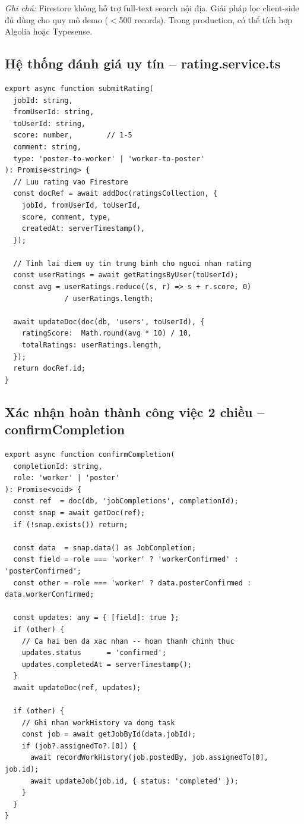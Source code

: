 \textit{Ghi chú:} Firestore không hỗ trợ full-text search nội địa. Giải pháp lọc
client-side đủ dùng cho quy mô demo ($<$500 records). Trong production, có thể tích hợp
Algolia hoặc Typesense.

\subsection{Hệ thống đánh giá uy tín -- rating.service.ts}

\begin{lstlisting}[caption={rating.service.ts -- submitRating và cập nhật điểm uy tín tự động}]
export async function submitRating(
  jobId: string,
  fromUserId: string,
  toUserId: string,
  score: number,        // 1-5
  comment: string,
  type: 'poster-to-worker' | 'worker-to-poster'
): Promise<string> {
  // Luu rating vao Firestore
  const docRef = await addDoc(ratingsCollection, {
    jobId, fromUserId, toUserId,
    score, comment, type,
    createdAt: serverTimestamp(),
  });

  // Tinh lai diem uy tin trung binh cho nguoi nhan rating
  const userRatings = await getRatingsByUser(toUserId);
  const avg = userRatings.reduce((s, r) => s + r.score, 0)
              / userRatings.length;

  await updateDoc(doc(db, 'users', toUserId), {
    ratingScore:  Math.round(avg * 10) / 10,
    totalRatings: userRatings.length,
  });
  return docRef.id;
}
\end{lstlisting}

\subsection{Xác nhận hoàn thành công việc 2 chiều -- confirmCompletion}

\begin{lstlisting}[caption={rating.service.ts -- Xác nhận hoàn thành 2 chiều (poster + worker)}]
export async function confirmCompletion(
  completionId: string,
  role: 'worker' | 'poster'
): Promise<void> {
  const ref  = doc(db, 'jobCompletions', completionId);
  const snap = await getDoc(ref);
  if (!snap.exists()) return;

  const data  = snap.data() as JobCompletion;
  const field = role === 'worker' ? 'workerConfirmed' : 'posterConfirmed';
  const other = role === 'worker' ? data.posterConfirmed : data.workerConfirmed;

  const updates: any = { [field]: true };
  if (other) {
    // Ca hai ben da xac nhan -- hoan thanh chinh thuc
    updates.status      = 'confirmed';
    updates.completedAt = serverTimestamp();
  }
  await updateDoc(ref, updates);

  if (other) {
    // Ghi nhan workHistory va dong task
    const job = await getJobById(data.jobId);
    if (job?.assignedTo?.[0]) {
      await recordWorkHistory(job.postedBy, job.assignedTo[0], job.id);
      await updateJob(job.id, { status: 'completed' });
    }
  }
}
\end{lstlisting}

